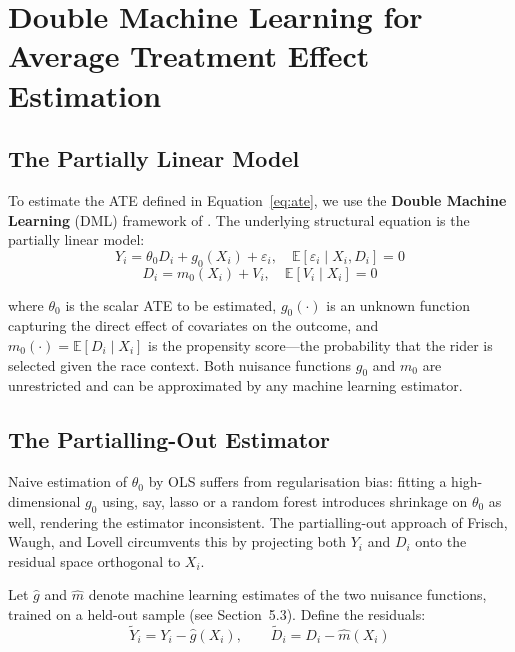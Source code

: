 \section{Double Machine Learning for Average Treatment Effect Estimation}

\subsection{The Partially Linear Model}

To estimate the ATE defined in Equation~\eqref{eq:ate}, we use the \textbf{Double Machine Learning} (DML) framework of \citet{chernozhukov2018}. The underlying structural equation is the partially linear model:
\begin{equation}
    Y_i = \theta_0 D_i + g_0(X_i) + \varepsilon_i, \quad \mathbb{E}[\varepsilon_i \mid X_i, D_i] = 0
    \label{eq:plm}
\end{equation}
\begin{equation}
    D_i = m_0(X_i) + V_i, \quad \mathbb{E}[V_i \mid X_i] = 0
    \label{eq:selection}
\end{equation}

where $\theta_0$ is the scalar ATE to be estimated, $g_0(\cdot)$ is an unknown function capturing the direct effect of covariates on the outcome, and $m_0(\cdot) = \mathbb{E}[D_i \mid X_i]$ is the propensity score---the probability that the rider is selected given the race context. Both nuisance functions $g_0$ and $m_0$ are unrestricted and can be approximated by any machine learning estimator.

\subsection{The Partialling-Out Estimator}

Naive estimation of $\theta_0$ by OLS suffers from regularisation bias: fitting a high-dimensional $g_0$ using, say, lasso or a random forest introduces shrinkage on $\theta_0$ as well, rendering the estimator inconsistent. The partialling-out approach of Frisch, Waugh, and Lovell circumvents this by projecting both $Y_i$ and $D_i$ onto the residual space orthogonal to $X_i$.

Let $\hat{g}$ and $\hat{m}$ denote machine learning estimates of the two nuisance functions, trained on a held-out sample (see Section~5.3). Define the residuals:
\begin{equation}
    \tilde{Y}_i = Y_i - \hat{g}(X_i), \qquad \tilde{D}_i = D_i - \hat{m}(X_i)
    \label{eq:residuals}
\end{equation}

